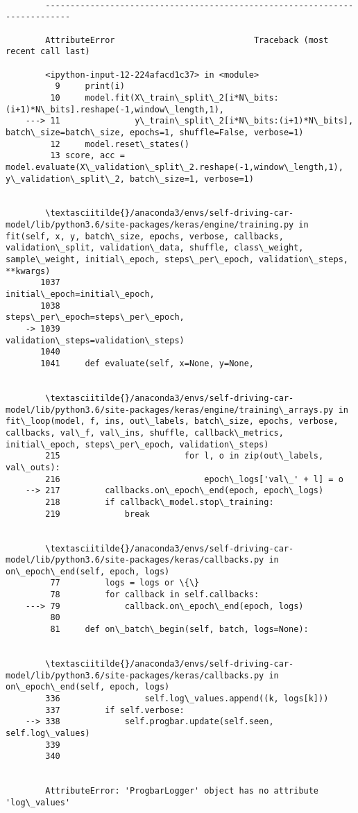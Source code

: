 \documentclass[11pt]{article}
\begin{document}
    \begin{Verbatim}[commandchars=\\\{\}]

        ---------------------------------------------------------------------------

        AttributeError                            Traceback (most recent call last)

        <ipython-input-12-224afacd1c37> in <module>
          9     print(i)
         10     model.fit(X\_train\_split\_2[i*N\_bits:(i+1)*N\_bits].reshape(-1,window\_length,1), 
    ---> 11               y\_train\_split\_2[i*N\_bits:(i+1)*N\_bits], batch\_size=batch\_size, epochs=1, shuffle=False, verbose=1)
         12     model.reset\_states()
         13 score, acc = model.evaluate(X\_validation\_split\_2.reshape(-1,window\_length,1), y\_validation\_split\_2, batch\_size=1, verbose=1)


        \textasciitilde{}/anaconda3/envs/self-driving-car-model/lib/python3.6/site-packages/keras/engine/training.py in fit(self, x, y, batch\_size, epochs, verbose, callbacks, validation\_split, validation\_data, shuffle, class\_weight, sample\_weight, initial\_epoch, steps\_per\_epoch, validation\_steps, **kwargs)
       1037                                         initial\_epoch=initial\_epoch,
       1038                                         steps\_per\_epoch=steps\_per\_epoch,
    -> 1039                                         validation\_steps=validation\_steps)
       1040 
       1041     def evaluate(self, x=None, y=None,


        \textasciitilde{}/anaconda3/envs/self-driving-car-model/lib/python3.6/site-packages/keras/engine/training\_arrays.py in fit\_loop(model, f, ins, out\_labels, batch\_size, epochs, verbose, callbacks, val\_f, val\_ins, shuffle, callback\_metrics, initial\_epoch, steps\_per\_epoch, validation\_steps)
        215                         for l, o in zip(out\_labels, val\_outs):
        216                             epoch\_logs['val\_' + l] = o
    --> 217         callbacks.on\_epoch\_end(epoch, epoch\_logs)
        218         if callback\_model.stop\_training:
        219             break


        \textasciitilde{}/anaconda3/envs/self-driving-car-model/lib/python3.6/site-packages/keras/callbacks.py in on\_epoch\_end(self, epoch, logs)
         77         logs = logs or \{\}
         78         for callback in self.callbacks:
    ---> 79             callback.on\_epoch\_end(epoch, logs)
         80 
         81     def on\_batch\_begin(self, batch, logs=None):


        \textasciitilde{}/anaconda3/envs/self-driving-car-model/lib/python3.6/site-packages/keras/callbacks.py in on\_epoch\_end(self, epoch, logs)
        336                 self.log\_values.append((k, logs[k]))
        337         if self.verbose:
    --> 338             self.progbar.update(self.seen, self.log\_values)
        339 
        340 


        AttributeError: 'ProgbarLogger' object has no attribute 'log\_values'

    \end{Verbatim}
\end{document}
